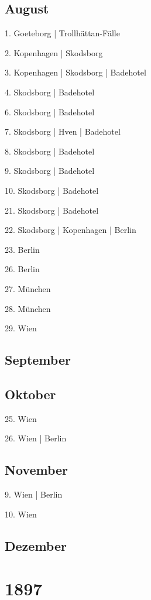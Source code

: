 \documentclass[twoside=false,titlepage=false,open=any, parskip=never, fontsize=10pt, headings=small, chapterprefix=false, appendixprefix=false, DIV=15]{scrbook}
\begin{document}
\begin{multicols}{3}
            \section*{August}
            1. Goeteborg | Trollhättan-Fälle\par
            2. Kopenhagen | Skodsborg\par
            3. Kopenhagen | Skodsborg | Badehotel\par
            4. Skodsborg | Badehotel\par
            6. Skodsborg | Badehotel\par
            7. Skodsborg | Hven | Badehotel\par
            8. Skodsborg | Badehotel\par
            9. Skodsborg | Badehotel\par
            10. Skodsborg | Badehotel\par
            21. Skodsborg | Badehotel\par
            22. Skodsborg | Kopenhagen | Berlin\par
            23. Berlin\par
            26. Berlin\par
            27. München\par
            28. München\par
            29. Wien\par
            \section*{September}
            \section*{Oktober}
            25. Wien\par
            26. Wien | Berlin\par
            \section*{November}
            9. Wien | Berlin\par
            10. Wien\par
            \section*{Dezember}
            \chapter*{1897}

\end{multicols}
\end{document}
